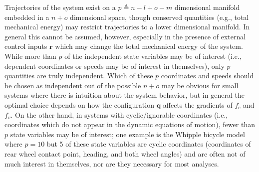 \documentclass{svjour3}                     %
\begin{document}
Trajectories of the system exist on a $p \triangleq n - l + o - m$ dimensional
manifold embedded in a $n + o$ dimensional space, though conserved quantities
(e.g., total mechanical energy) may restrict trajectories to a lower
dimensional manifold.  In general this cannot be assumed, however, especially
in the presence of external control inputs $\bm{r}$ which may change the total
mechanical energy of the system.  While more than $p$ of the independent state
variables may be of interest (i.e., dependent coordinates or speeds may be of
interest in themselves), only $p$ quantities are truly independent.  Which of
these $p$ coordinates and speeds should be chosen as independent out of the
possible $n + o$ may be obvious for small systems where there is intuition
about the system behavior, but in general the optimal choice depends on how the
configuration $\bm{q}$ affects the gradients of $f_c$ and $f_v$.  On the other
hand, in systems with cyclic/ignorable coordinates (i.e., coordinates which do
not appear in the dynamic equations of motion), fewer than $p$ state
variables may be of interest; one example is the Whipple bicycle model where
$p=10$ but 5 of these state variables are cyclic coordinates (coordinates of
rear wheel contact point, heading, and both wheel angles) and are often not of
much interest in themselves, nor are they necessary for most analyses.
\end{document}
